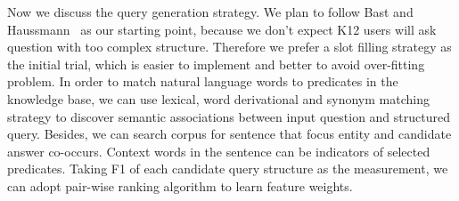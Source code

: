 Now we discuss the query generation strategy.
We plan to follow Bast and Haussmann~\cite{bast2015more} as our starting point, because we don't
expect K12 users will ask question with too complex structure.
Therefore we prefer a slot filling strategy as the initial trial, which is easier to implement
and better to avoid over-fitting problem.
In order to match natural language words to predicates in the knowledge base,
we can use lexical, word derivational and synonym matching strategy to discover semantic
associations between input question and structured query.
Besides, we can search corpus for sentence that focus entity and candidate answer co-occurs.
Context words in the sentence can be indicators of selected predicates.
Taking F1 of each candidate query structure as the measurement,
we can adopt pair-wise ranking algorithm to learn feature weights.


